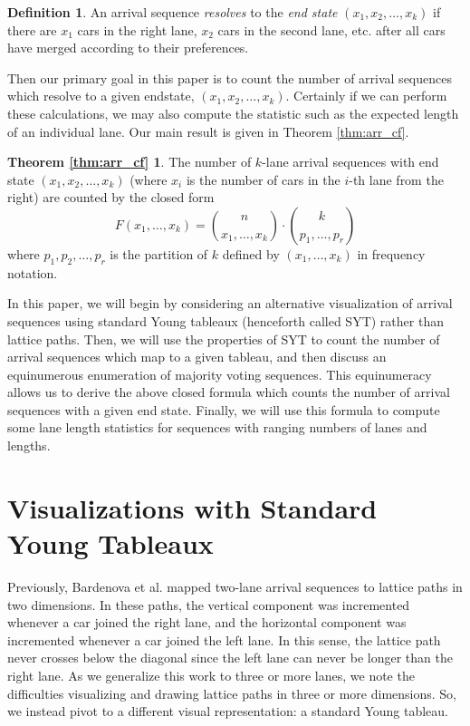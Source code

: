 \documentclass[article]{amsart}
\theoremstyle{plain}
\theoremstyle{definition}
\newtheorem{definition}{Definition}
\begin{document}
\begin{definition}
    An arrival sequence \textit{resolves} to the \textit{end state} $(x_1,x_2, \dots, x_k)$ if there are $x_1$ cars in the right lane, $x_2$ cars in the second lane, etc. after all cars have merged according to their preferences.
\end{definition}

Then our primary goal in this paper is to count the number of arrival sequences which resolve to a given endstate, $(x_1, x_2, \dots, x_k)$. Certainly if we can perform these calculations, we may also compute the statistic such as the expected length of an individual lane. Our main result is given in Theorem \ref{thm:arr_cf}.

\newtheorem*{thm:main}{Theorem \ref{thm:arr_cf}}
\begin{thm:main}
The number of $k$-lane arrival sequences with end state $(x_1, x_2, \dots, x_k)$ (where $x_i$ is the number of cars in the $i$-th lane from the right) are counted by the closed form
\[ F(x_1, \dots, x_k) = \binom{n}{x_1, \dots, x_k} \cdot \binom{k}{p_1, \dots, p_r} \]
where $p_1, p_2, \dots, p_r$ is the partition of $k$ defined by $(x_1, \dots, x_k)$ in frequency notation.
\end{thm:main}

In this paper, we will begin by considering an alternative visualization of arrival sequences using standard Young tableaux (henceforth called SYT) rather than lattice paths. Then, we will use the properties of SYT to count the number of arrival sequences which map to a given tableau, and then discuss an equinumerous
enumeration of majority voting sequences. This equinumeracy
allows us to derive the above closed formula which counts the number of arrival sequences with a given end state. Finally, we will use this formula to compute some lane length statistics for sequences with ranging numbers of lanes and lengths.


\section{Visualizations with Standard Young Tableaux} \label{sec:syt}

Previously, Bardenova et al. \cite{bard} mapped two-lane arrival sequences to lattice paths in two dimensions. In these paths, the vertical component was incremented whenever a car joined the right lane, and the horizontal component was incremented whenever a car joined the left lane. In this sense, the lattice path never crosses below the diagonal since the left lane can never be longer than the right lane. As we generalize this work to three or more lanes, we note the difficulties visualizing and drawing lattice paths in three or more dimensions. So, we instead pivot to a different visual representation: a standard Young tableau. 
\end{document}
